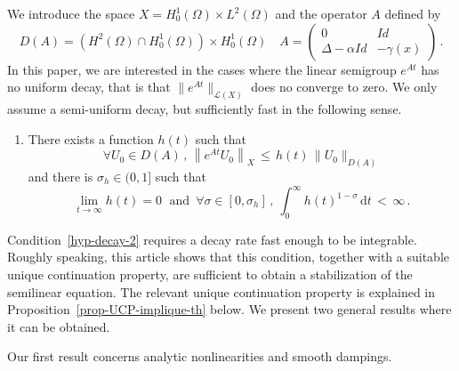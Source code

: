 \documentclass[AHL,Unicode,longabstracts]{cedram}
\newcommand{\Lc}{\mathcal{L}}
\newcommand{\drm}{\mathrm{d}}
\newcommand*{\romanenumi}{\renewcommand*{\theenumi}{\roman{enumi}}}
\let\oldforall\forall
\renewcommand*{\forall}{\mathrel{\oldforall}}
\begin{document}
We introduce the space $X=H^1_0(\Omega)\times L^2(\Omega)$ and the operator $A$ defined by
\[
D(A)=\left(H^2(\Omega)\cap H^1_0(\Omega)\right)\times H^1_0(\Omega)\quad
A =
\begin{pmatrix}
0 & Id \\
\Delta-\alpha Id & -\gamma(x)
\end{pmatrix}\,.
\]
In this paper, we are interested in the cases where the linear semigroup $e^{At}$ has no uniform decay, that is that $\|e^{At}\|_{\Lc(X)}$ does no converge to zero. We only assume a semi-uniform decay, but sufficiently fast in the following sense.

\begingroup
\begin{enumerate}\romanenumi
\setcounter{enumi}{4}
\item \label{listintro1.5}There exists a function $h(t)$ such that
\begin{equation}\label{hyp-decay-1}
\forall U_0\in D(A)\,,\,\left\|e^{At}U_0\right\|_X \, \leq \, h(t)\,\|U_0\|_{D(A)}
\end{equation}
and there is $\sigma_h\in(0,1]$ such that
\begin{equation}\label{hyp-decay-2}
\lim_{t\rightarrow \infty}h(t)=0\;\text{ and }\,
\forall \sigma\in[0,\sigma_h]\,,\:\int_0^\infty h(t)^{1-\sigma}\,\drm t\,<\,\infty\,.
\end{equation}
\end{enumerate}
\endgroup
Condition~\eqref{hyp-decay-2} requires a decay rate fast enough to be integrable. Roughly speaking, this article shows that this condition, together with a suitable unique continuation property, are sufficient to obtain a stabilization of the semilinear equation. The relevant unique continuation property is explained in Proposition~\ref{prop-UCP-implique-th} below. We present two general results where it can be obtained.

Our first result concerns analytic nonlinearities and smooth dampings.
\end{document}
